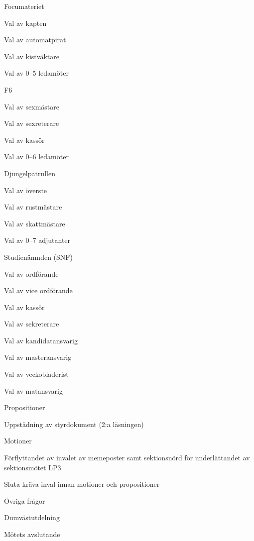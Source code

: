 \documentclass{sektionsmote}
\begin{document}
\begin{ootd}
\begin{ootd}
    \item Focumateriet
    \begin{ootd}
        \item Val av kapten
        \item Val av automatpirat
        \item Val av kistväktare
        \item Val av 0--5 ledamöter
    \end{ootd}
    \item F6
    \begin{ootd}
        \item Val av sexmästare
        \item Val av sexreterare
        \item Val av kassör
        \item Val av 0--6 ledamöter
    \end{ootd}
    \item Djungelpatrullen
    \begin{ootd}
        \item Val av överste
        \item Val av rustmästare
        \item Val av skattmästare
        \item Val av 0--7 adjutanter
    \end{ootd}
    \item Studienämnden (SNF)
    \begin{ootd}
        \item Val av ordförande
        \item Val av vice ordförande
        \item Val av kassör
        \item Val av sekreterare
        \item Val av kandidatansvarig
        \item Val av masteransvarig
        \item Val av veckobladerist
        \item Val av matansvarig
    \end{ootd}
\end{ootd}

\item{Propositioner}
\begin{ootd}
    \item Uppstädning av styrdokument (2:a läsningen)
\end{ootd}

\item{Motioner}
\begin{ootd}
    \item Förflyttandet av invalet av memeposter samt sektionsnörd för underlättandet av sektionsmötet LP3
    \item Sluta kräva inval innan motioner och propositioner
\end{ootd}

\item{Övriga frågor}

\item{Dumvästutdelning}

\item{Mötets avslutande}
\end{ootd}
\end{document}
